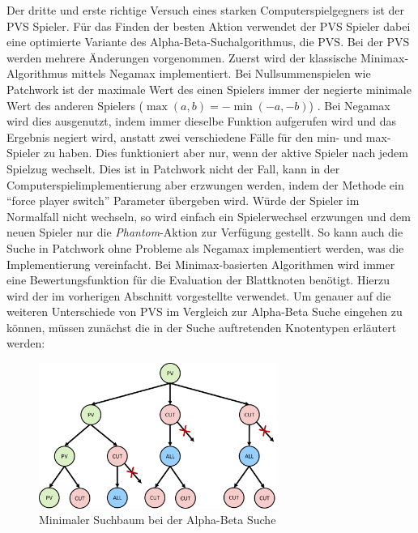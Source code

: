 Der dritte und erste richtige Versuch eines starken Computerspielgegners ist der \acl{PVS} Spieler. Für das Finden der besten Aktion verwendet der \acs{PVS} Spieler dabei eine optimierte Variante des Alpha-Beta-Suchalgorithmus, die \acf{PVS}. Bei der \ac{PVS} werden mehrere Änderungen vorgenommen. Zuerst wird der klassische Minimax-Algorithmus mittels Negamax implementiert. Bei Nullsummenspielen wie Patchwork ist der maximale Wert des einen Spielers immer der negierte minimale Wert des anderen Spielers ($\max\left(a,b\right) = -\min\left(-a,-b\right)$) \cite[S. 9]{2020.MinimaxTheorem}. Bei Negamax wird dies ausgenutzt, indem immer dieselbe Funktion aufgerufen wird und das Ergebnis negiert wird, anstatt zwei verschiedene Fälle für den min- und max-Spieler zu haben. Dies funktioniert aber nur, wenn der aktive Spieler nach jedem Spielzug wechselt. Dies ist in Patchwork nicht der Fall, kann in der Computerspielimplementierung aber erzwungen werden, indem der  Methode ein \enquote{force player switch} Parameter übergeben wird. Würde der Spieler im Normalfall nicht wechseln, so wird einfach ein Spielerwechsel erzwungen und dem neuen Spieler nur die \emph{Phantom}-Aktion zur Verfügung gestellt. So kann auch die Suche in Patchwork ohne Probleme als Negamax implementiert werden, was die Implementierung vereinfacht. Bei Minimax-basierten Algorithmen wird immer eine Bewertungsfunktion für die Evaluation der Blattknoten benötigt. Hierzu wird der im vorherigen Abschnitt vorgestellte  verwendet. Um genauer auf die weiteren Unterschiede von \ac{PVS} im Vergleich zur Alpha-Beta Suche eingehen zu können, müssen zunächst die in der Suche auftretenden Knotentypen erläutert werden:

\vspace*{-0.45cm}

\begin{figure}[!ht]
    \centering
    \includegraphics[width=0.695\textwidth]{res/pictures/minimal-search-tree.pdf}
    \caption{Minimaler Suchbaum bei der Alpha-Beta Suche}
    \label{fig:minimal-search-tree}
\end{figure}

